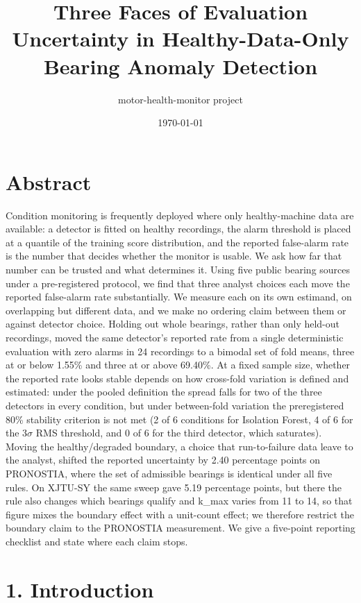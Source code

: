 \documentclass[11pt]{article}
\title{Three Faces of Evaluation Uncertainty in Healthy-Data-Only Bearing Anomaly Detection}
\author{motor-health-monitor project}
\date{\today}
\begin{document}
\maketitle
\section{Abstract}

Condition monitoring is frequently deployed where only healthy-machine data are available: a detector is fitted on healthy recordings, the alarm threshold is placed at a quantile of the training score distribution, and the reported false-alarm rate is the number that decides whether the monitor is usable. We ask how far that number can be trusted and what determines it. Using five public bearing sources under a pre-registered protocol, we find that three analyst choices each move the reported false-alarm rate substantially. We measure each on its own estimand, on overlapping but different data, and we make no ordering claim between them or against detector choice. Holding out whole bearings, rather than only held-out recordings, moved the same detector's reported rate from a single deterministic evaluation with zero alarms in 24 recordings to a bimodal set of fold means, three at or below 1.55\% and three at or above 69.40\%. At a fixed sample size, whether the reported rate looks stable depends on how cross-fold variation is defined and estimated: under the pooled definition the spread falls for two of the three detectors in every condition, but under between-fold variation the preregistered 80\% stability criterion is not met (2 of 6 conditions for Isolation Forest, 4 of 6 for the 3$\sigma$ RMS threshold, and 0 of 6 for the third detector, which saturates). Moving the healthy/degraded boundary, a choice that run-to-failure data leave to the analyst, shifted the reported uncertainty by 2.40 percentage points on PRONOSTIA, where the set of admissible bearings is identical under all five rules. On XJTU-SY the same sweep gave 5.19 percentage points, but there the rule also changes which bearings qualify and k\_max varies from 11 to 14, so that figure mixes the boundary effect with a unit-count effect; we therefore restrict the boundary claim to the PRONOSTIA measurement. We give a five-point reporting checklist and state where each claim stops.



\section{1. Introduction}
\end{document}

